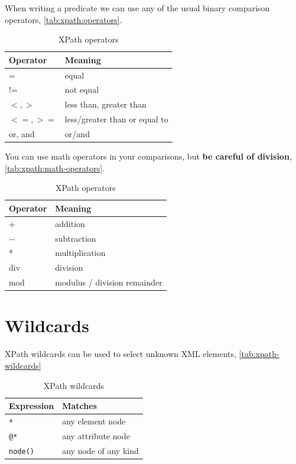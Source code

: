 \documentclass{pgnotes}
\begin{document}
When writing a predicate we can use any of the usual binary comparison operators, \autoref{tab:xpath:operators}.

\begin{table}[htbp]
  \centering
  \begin{tabular}{l l}
    \toprule
    \textbf{Operator} & \textbf{Meaning} \\
    \midrule
    = & equal \\
    != & not equal \\
    $<, >$ & less than, greater than \\
    $<=, >=$ & less/greater than or equal to \\
    or, and & or/and \\
    \bottomrule
  \end{tabular}
  \caption{XPath operators}
  \label{tab:xpath:operators}
\end{table}

You can use math operators in your comparisons, but \textbf{be careful of division}, \autoref{tab:xpath:math-operators}. 

\begin{table}[htbp]
  \centering
  \begin{tabular}{l l}
    \toprule
    \textbf{Operator} & \textbf{Meaning} \\
    \midrule
    $+$ & addition \\
    $-$ & subtraction \\
    * & multiplication \\
    div & division \\
    mod & modulus / division remainder\\
    \bottomrule
  \end{tabular}
  \caption{XPath operators}
  \label{tab:xpath:math-operators}
\end{table}


\section{Wildcards}

XPath wildcards can be used to select unknown XML elements, \autoref{tab:xpath-wildcards}

\begin{table}[htbp]
  \centering
  \begin{tabular}{l l}
    \toprule
    \textbf{Expression} & \textbf{Matches} \\
    \midrule
    \texttt{*} &  any element node \\
    \texttt{@*} &  any attribute node \\
    \texttt{node()} & any node of any kind \\
    \bottomrule
  \end{tabular}
  \caption{XPath wildcards}
  \label{tab:xpath-wildcards}
\end{table}
\end{document}
